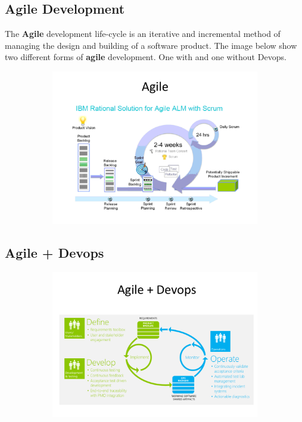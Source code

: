 \documentclass[a4paper]{report}
\begin{document}
\subsection{Agile Development}
The \textbf{Agile} development life-cycle is an iterative and incremental method of managing the design and building of a software product. The image below show two different forms of \textbf{agile} development. One with and one without Devops.
\begin{figure}[H]
\hskip-2.5cm\begin{subfigure}{1.2\textwidth}
  \includegraphics[width=1.2\linewidth]
  {images/3-Agile.png}
\end{subfigure}
\end{figure}
\subsection{Agile + Devops}
\begin{figure}[H]
\hskip-2.5cm\begin{subfigure}{1.2\textwidth}
  \includegraphics[width=1.2\linewidth]
  {images/3-ADevops.png}
\end{subfigure}
\end{figure}
\end{document}
